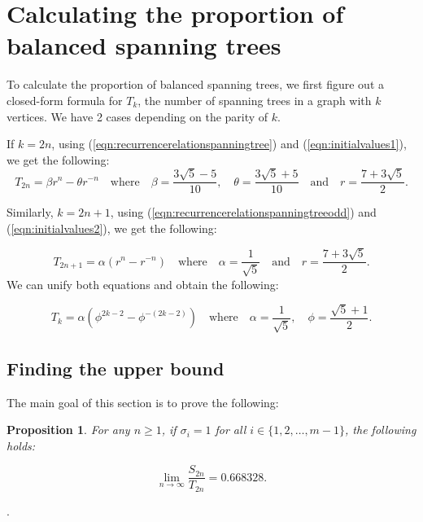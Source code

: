 \documentclass{amsart}
\newtheorem{proposition}[theorem]{Proposition}
\theoremstyle{definition}
\newcommand{\yandi}[1]{\marginpar{\tiny \color{red} Yandi: #1}}
\newcommand{\saugat}[1]{\marginpar{\tiny \color{blue} Saugat: #1}}
\newcommand{\longnguyen}[1]
{\marginpar{\tiny \color{purple} Long: #1}}
\begin{document}
\section{Calculating the proportion of balanced spanning trees} \label{sec:proportion}

To calculate the proportion of balanced spanning trees, we first figure out a closed-form formula for $T_{k}$, the number of spanning trees in a graph with $k$ vertices. We have 2 cases depending on the parity of $k$. 
\par 
If $k=2n$, using (\ref{eqn:recurrencerelationspanningtree})
and (\ref{eqn:initialvalues1}), we get the following: 
\begin{equation}\label{eqn:evencaseformula}
    T_{2n} = \beta r^n - \theta r^{-n}  \quad \text{where} \quad 
    \beta = \frac{3\sqrt{5} - 5}{10}, \quad \theta = \frac{3\sqrt{5} + 5}{10} \quad \text{and} \quad r = \frac{7 + 3\sqrt{5}}{2}.
\end{equation}

Similarly, $k=2n+1$, using (\ref{eqn:recurrencerelationspanningtreeodd})
and (\ref{eqn:initialvalues2}), we get the following:  

\begin{equation}\label{eqn:oddcaseformula}
    T_{2n + 1} = \alpha (r^n - r^{-n} ) \quad \text{where} \quad 
    \alpha = \frac{1}{\sqrt{5}} \quad \text{and} \quad r = \frac{7 + 3\sqrt{5}}{2}.
\end{equation}
We can unify both equations and obtain the following: 

\begin{equation}\label{eqn:unifiedeqn}
    T_k = \alpha (\phi^{2k - 2} - \phi^{-(2k - 2)}) \quad \text{where} \quad \alpha = \frac{1}{\sqrt{5}}, \quad \phi = \frac{\sqrt{5} + 1}{2} .
\end{equation}

\subsection{Finding the upper bound}

The main goal of this section is to prove the following: \begin{proposition}\label{prop:upperbound}
For any $n \geq 1$, if $\sigma_i = 1$ for all $i \in \{1, 2, \dots, m-1\}$, the following holds:

\[\lim_{n\to \infty}\frac{S_{2n}}{T_{2n}} = 0.668328.\]
\end{proposition}.
\end{document}
